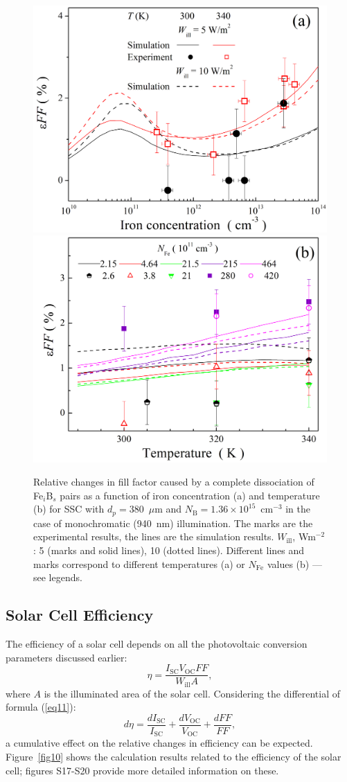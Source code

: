 \documentclass[a4paper,fleqn]{cas-sc}
\begin{document}
\begin{figure}
	\centering
     \includegraphics[width=0.4\linewidth]{Fig9a.png}
     \includegraphics[width=0.4\linewidth]{Fig9b.png}
	  \caption{Relative changes in fill factor caused by a complete
       dissociation of Fe$_i$B$_s$ pairs as a function of iron concentration (a) and
       temperature (b) for SSC with $d_p=380$~$\mu$m and $N_\mathrm{B}=1.36\times10^{15}$~cm$^{-3}$
       in the case of monochromatic (940~nm) illumination.
       The marks are the experimental results, the lines are the simulation results.
       $W_\mathrm{ill}$, Wm$^{-2}$: 5 (marks and solid lines), 10 (dotted lines).
       Different lines and marks correspond to different temperatures (a) or $N_\mathrm{Fe}$ values (b) --- see legends.
}\label{fig9}
\end{figure}

\subsection{Solar Cell Efficiency}

The efficiency of a solar cell depends on all the photovoltaic conversion parameters discussed earlier: 
\begin{equation}
\label{eq11}
    \eta = \frac{I_\mathrm{SC}V_\mathrm{OC}FF}{W_\mathrm{ill}A},
\end{equation}
where $A$ is the illuminated area of the solar cell. Considering the differential of formula (\ref{eq11}):
\begin{equation}
\label{eq12}
    d\eta = \frac{dI_\mathrm{SC}}{I_\mathrm{SC}}+\frac{dV_\mathrm{OC}}{V_\mathrm{OC}}+\frac{dFF}{FF},
\end{equation}
a cumulative effect on the relative changes in efficiency can be expected. Figure~\ref{fig10} shows the calculation results related to the efficiency of the solar cell; figures S17-S20 provide more detailed information on these.
\end{document}
